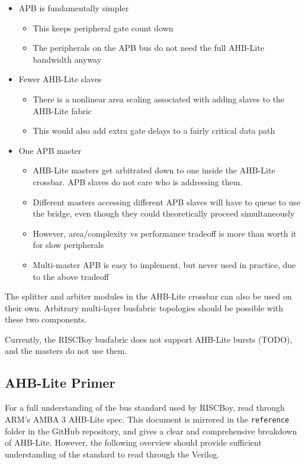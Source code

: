 \documentclass[notitlepage]{article}
\begin{document}
\begin{itemize}
	\item APB is fundamentally simpler
	\begin{itemize}
		\item This keeps peripheral gate count down
		\item The peripherals on the APB bus do not need the full AHB-Lite bandwidth anyway
	\end{itemize}
	\item Fewer AHB-Lite slaves
	\begin{itemize}
		\item There is a nonlinear area scaling associated with adding slaves to the AHB-Lite fabric
		\item This would also add extra gate delays to a fairly critical data path
	\end{itemize}
	\item One APB master
	\begin{itemize}
		\item AHB-Lite masters get arbitrated down to one inside the AHB-Lite crossbar. APB slaves do not care who is addressing them.
		\item Different masters accessing different APB slaves will have to queue to use the bridge, even though they could theoretically proceed simultaneously
		\item However, area/complexity vs performance tradeoff is more than worth it for slow peripherals
		\item Multi-master APB is easy to implement, but never used in practice, due to the above tradeoff
	\end{itemize}
\end{itemize}

The splitter and arbiter modules in the AHB-Lite crossbar can also be used on their own. Arbitrary multi-layer busfabric topologies should be possible with these two components.

Currently, the RISCBoy busfabric does not support AHB-Lite bursts (TODO), and the masters do not use them.

\subsection{AHB-Lite Primer}

For a full understanding of the bus standard used by RISCBoy, read through ARM's AMBA 3 AHB-Lite spec. This document is mirrored in the \texttt{reference} folder in the GitHub repository, and gives a clear and comprehensive breakdown of AHB-Lite. However, the following overview should provide sufficient understanding of the standard to read through the Verilog.
\end{document}
